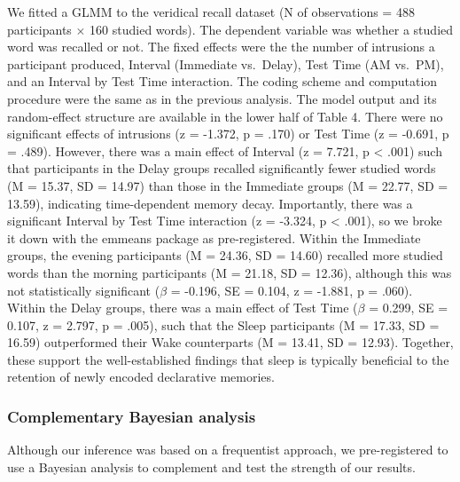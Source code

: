 \documentclass[
]{article}
\begin{document}
We fitted a GLMM to the veridical recall dataset (N of observations = 488 participants \(\times\) 160 studied words). The dependent variable was whether a studied word was recalled or not. The fixed effects were the the number of intrusions a participant produced, Interval (Immediate vs.~Delay), Test Time (AM vs.~PM), and an Interval by Test Time interaction. The coding scheme and computation procedure were the same as in the previous analysis. The model output and its random-effect structure are available in the lower half of Table 4. There were no significant effects of intrusions (z = -1.372, p = .170) or Test Time (z = -0.691, p = .489). However, there was a main effect of Interval (z = 7.721, p \textless{} .001) such that participants in the Delay groups recalled significantly fewer studied words (M = 15.37, SD = 14.97) than those in the Immediate groups (M = 22.77, SD = 13.59), indicating time-dependent memory decay. Importantly, there was a significant Interval by Test Time interaction (z = -3.324, p \textless{} .001), so we broke it down with the emmeans package as pre-registered. Within the Immediate groups, the evening participants (M = 24.36, SD = 14.60) recalled more studied words than the morning participants (M = 21.18, SD = 12.36), although this was not statistically significant (\(\beta\) = -0.196, SE = 0.104, z = -1.881, p = .060). Within the Delay groups, there was a main effect of Test Time (\(\beta\) = 0.299, SE = 0.107, z = 2.797, p = .005), such that the Sleep participants (M = 17.33, SD = 16.59) outperformed their Wake counterparts (M = 13.41, SD = 12.93). Together, these support the well-established findings that sleep is typically beneficial to the retention of newly encoded declarative memories.

\hypertarget{complementary-bayesian-analysis}{%
\subsubsection{Complementary Bayesian analysis}\label{complementary-bayesian-analysis}}

Although our inference was based on a frequentist approach, we pre-registered to use a Bayesian analysis to complement and test the strength of our results.
\end{document}
